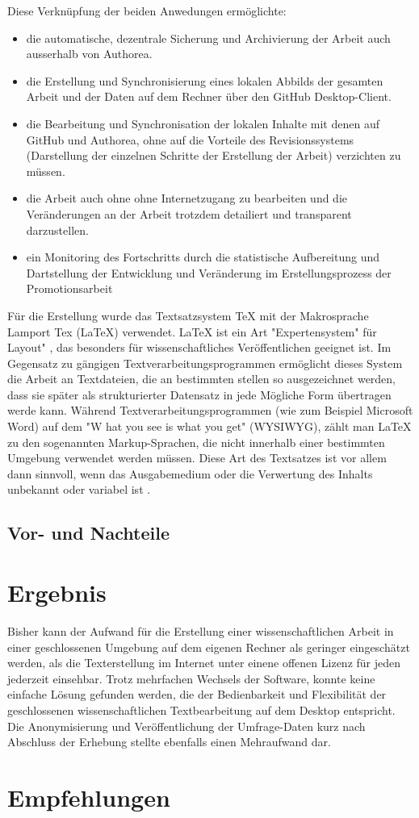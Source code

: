 Diese Verknüpfung der beiden Anwedungen ermöglichte:
\begin{itemize}
\item die automatische, dezentrale Sicherung und Archivierung der Arbeit auch ausserhalb von Authorea.
\item die Erstellung und Synchronisierung eines lokalen Abbilds der gesamten Arbeit und der Daten auf dem Rechner über den GitHub Desktop-Client.
\item die Bearbeitung und Synchronisation der lokalen Inhalte mit denen auf GitHub und Authorea, ohne auf die Vorteile des Revisionssystems (Darstellung der einzelnen Schritte der Erstellung der Arbeit) verzichten zu müssen.
\item die Arbeit auch ohne ohne Internetzugang zu bearbeiten und die Veränderungen an der Arbeit trotzdem detailiert und transparent darzustellen.
\item ein Monitoring des Fortschritts durch die statistische Aufbereitung und Dartstellung der Entwicklung und Veränderung im Erstellungsprozess der Promotionsarbeit
\end{itemize}

Für die Erstellung wurde das Textsatzsystem TeX mit der Makrosprache Lamport Tex (LaTeX) verwendet. LaTeX ist ein Art "Expertensystem" für Layout" \cite{suchen}, das besonders für wissenschaftliches Veröffentlichen geeignet ist. Im Gegensatz zu gängigen Textverarbeitungsprogrammen ermöglicht dieses System die Arbeit an Textdateien, die an bestimmten stellen so ausgezeichnet werden, dass sie später als strukturierter Datensatz in jede Mögliche Form übertragen werde kann. Während Textverarbeitungsprogrammen (wie zum Beispiel Microsoft Word) auf dem "W
hat you see is what you get" (WYSIWYG), zählt man LaTeX zu den sogenannten Markup-­Sprachen, die nicht innerhalb einer bestimmten Umgebung verwendet werden müssen. Diese Art des Textsatzes ist vor allem dann sinnvoll, wenn das Ausgabemedium oder die Verwertung des Inhalts unbekannt oder variabel ist \cite{suchen}.

\subsection{Vor- und Nachteile}


\section{Ergebnis}

Bisher kann der Aufwand für die Erstellung einer wissenschaftlichen Arbeit in einer geschlossenen Umgebung auf dem eigenen Rechner als geringer eingeschätzt werden, als die Texterstellung im Internet unter einene offenen Lizenz für jeden jederzeit einsehbar. Trotz mehrfachen Wechsels der Software, konnte keine einfache Lösung gefunden werden, die der Bedienbarkeit und Flexibilität der geschlossenen wissenschaftlichen Textbearbeitung auf dem Desktop entspricht. Die Anonymisierung und Veröffentlichung der Umfrage-Daten kurz nach Abschluss der Erhebung stellte ebenfalls einen Mehraufwand dar.

\section{Empfehlungen}
